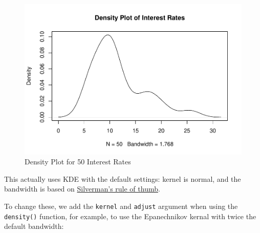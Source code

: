 \documentclass[
]{book}
\newenvironment{Shaded}{\begin{snugshade}}{\end{snugshade}}
\newcommand{\AttributeTok}[1]{\textcolor[rgb]{0.13,0.29,0.53}{#1}}
\newcommand{\DecValTok}[1]{\textcolor[rgb]{0.00,0.00,0.81}{#1}}
\newcommand{\DocumentationTok}[1]{\textcolor[rgb]{0.56,0.35,0.01}{\textbf{\textit{#1}}}}
\newcommand{\FunctionTok}[1]{\textcolor[rgb]{0.13,0.29,0.53}{\textbf{#1}}}
\newcommand{\NormalTok}[1]{#1}
\newcommand{\OtherTok}[1]{\textcolor[rgb]{0.56,0.35,0.01}{#1}}
\newcommand{\SpecialCharTok}[1]{\textcolor[rgb]{0.81,0.36,0.00}{\textbf{#1}}}
\newcommand{\StringTok}[1]{\textcolor[rgb]{0.31,0.60,0.02}{#1}}
\begin{document}
\begin{Shaded}
\end{Shaded}

\begin{figure}
\centering
\includegraphics{bookdown-demo_files/figure-latex/4-R-1.pdf}
\caption{\label{fig:4-R}Density Plot for 50 Interest Rates}
\end{figure}

This actually uses KDE with the default settings: kernel is normal, and the bandwidth is based on \href{https://en.wikipedia.org/wiki/Kernel_density_estimation\#A_rule-of-thumb_bandwidth_estimator}{Silverman's rule of thumb}.

To change these, we add the \texttt{kernel} and \texttt{adjust} argument when using the \texttt{density()} function, for example, to use the Epanechnikov kernal with twice the default bandwidth:

\begin{Shaded}
\end{Shaded}
\end{document}
